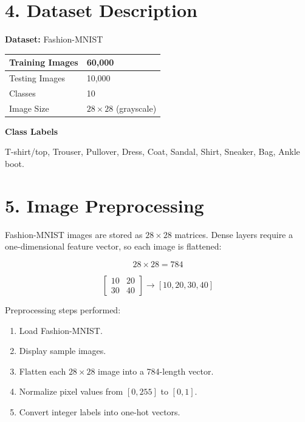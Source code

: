 \documentclass[11pt]{article}
\begin{document}

\section*{4. Dataset Description}

\textbf{Dataset:} Fashion-MNIST

\begin{center}
\begin{tabular}{|l|l|}
\hline
Training Images & 60,000\\
\hline
Testing Images & 10,000\\
\hline
Classes & 10\\
\hline
Image Size & $28 \times 28$ (grayscale)\\
\hline
\end{tabular}
\end{center}

\textbf{Class Labels}

T-shirt/top, Trouser, Pullover, Dress, Coat, Sandal, Shirt, Sneaker, Bag, Ankle boot.


\section*{5. Image Preprocessing}

Fashion-MNIST images are stored as $28 \times 28$ matrices. Dense layers require a one-dimensional feature vector, so each image is flattened:

\[
28 \times 28 = 784
\]

\[
\begin{bmatrix} 10 & 20 \\ 30 & 40 \end{bmatrix} \rightarrow [10, 20, 30, 40]
\]

Preprocessing steps performed:

\begin{enumerate}[leftmargin=*]
\item Load Fashion-MNIST.
\item Display sample images.
\item Flatten each $28\times28$ image into a 784-length vector.
\item Normalize pixel values from $[0,255]$ to $[0,1]$.
\item Convert integer labels into one-hot vectors.
\end{enumerate}
\end{document}
